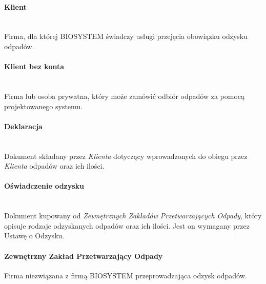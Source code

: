 \paragraph{Klient} \ \\
Firma, dla której BIOSYSTEM świadczy usługi przejęcia obowiązku odzysku odpadów.

\paragraph{Klient bez konta} \ \\
Firma lub osoba prywatna, który może zamówić odbiór odpadów za pomocą projektowanego systemu.

\paragraph{Deklaracja} \ \\
Dokument składany przez \emph{Klienta} dotyczący wprowadzonych do obiegu przez \emph{Klienta} odpadów oraz ich ilości.

\paragraph{Oświadczenie odzysku} \ \\
Dokument kupowany od \emph{Zewnętrznych Zakładów Przetwarzających Odpady}, który opisuje rodzaje odzyskanych odpadów oraz ich ilości.
Jest on wymagany przez Ustawę o Odzysku.

\paragraph{Zewnętrzny Zakład Przetwarzający Odpady}
Firma niezwiązana z firmą BIOSYSTEM przeprowadzająca odzysk odpadów.
